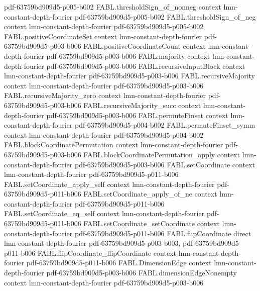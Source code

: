 \begin{theorem}
  {pdf-63759bd909d5-p005-b002}
\proofstep
  {FABL.thresholdSign_of_nonneg}
  {context}
  {lmn-constant-depth-fourier}
  {pdf-63759bd909d5-p005-b002}
\proofstep
  {FABL.thresholdSign_of_neg}
  {context}
  {lmn-constant-depth-fourier}
  {pdf-63759bd909d5-p005-b002}
\proofstep
  {FABL.positiveCoordinateSet}
  {context}
  {lmn-constant-depth-fourier}
  {pdf-63759bd909d5-p003-b006}
\proofstep
  {FABL.positiveCoordinateCount}
  {context}
  {lmn-constant-depth-fourier}
  {pdf-63759bd909d5-p003-b006}
\proofstep
  {FABL.majority}
  {context}
  {lmn-constant-depth-fourier}
  {pdf-63759bd909d5-p003-b006}
\proofstep
  {FABL.recursiveInputBlock}
  {context}
  {lmn-constant-depth-fourier}
  {pdf-63759bd909d5-p003-b006}
\proofstep
  {FABL.recursiveMajority}
  {context}
  {lmn-constant-depth-fourier}
  {pdf-63759bd909d5-p003-b006}
\proofstep
  {FABL.recursiveMajority_zero}
  {context}
  {lmn-constant-depth-fourier}
  {pdf-63759bd909d5-p003-b006}
\proofstep
  {FABL.recursiveMajority_succ}
  {context}
  {lmn-constant-depth-fourier}
  {pdf-63759bd909d5-p003-b006}
\proofstep
  {FABL.permuteFinset}
  {context}
  {lmn-constant-depth-fourier}
  {pdf-63759bd909d5-p004-b002}
\proofstep
  {FABL.permuteFinset_symm}
  {context}
  {lmn-constant-depth-fourier}
  {pdf-63759bd909d5-p004-b002}
\proofstep
  {FABL.blockCoordinatePermutation}
  {context}
  {lmn-constant-depth-fourier}
  {pdf-63759bd909d5-p003-b006}
\proofstep
  {FABL.blockCoordinatePermutation_apply}
  {context}
  {lmn-constant-depth-fourier}
  {pdf-63759bd909d5-p003-b006}
\proofstep
  {FABL.setCoordinate}
  {context}
  {lmn-constant-depth-fourier}
  {pdf-63759bd909d5-p011-b006}
\proofstep
  {FABL.setCoordinate_apply_self}
  {context}
  {lmn-constant-depth-fourier}
  {pdf-63759bd909d5-p011-b006}
\proofstep
  {FABL.setCoordinate_apply_of_ne}
  {context}
  {lmn-constant-depth-fourier}
  {pdf-63759bd909d5-p011-b006}
\proofstep
  {FABL.setCoordinate_eq_self}
  {context}
  {lmn-constant-depth-fourier}
  {pdf-63759bd909d5-p011-b006}
\proofstep
  {FABL.setCoordinate_setCoordinate}
  {context}
  {lmn-constant-depth-fourier}
  {pdf-63759bd909d5-p011-b006}
\proofstep
  {FABL.flipCoordinate}
  {direct}
  {lmn-constant-depth-fourier}
  {pdf-63759bd909d5-p003-b003,
    pdf-63759bd909d5-p011-b006}
\proofstep
  {FABL.flipCoordinate_flipCoordinate}
  {context}
  {lmn-constant-depth-fourier}
  {pdf-63759bd909d5-p011-b006}
\proofstep
  {FABL.DimensionEdge}
  {context}
  {lmn-constant-depth-fourier}
  {pdf-63759bd909d5-p003-b006}
\proofstep
  {FABL.dimensionEdgeNonempty}
  {context}
  {lmn-constant-depth-fourier}
  {pdf-63759bd909d5-p003-b006}

\end{theorem}
